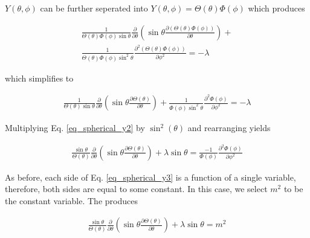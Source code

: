 \documentclass{article}
\numberwithin{equation}{subsection}
\begin{document}
$Y(\theta, \phi)$ can be further seperated into $Y(\theta, \phi) = \Theta(\theta)\Phi(\phi)$ which produces

\begin{equation}\label{eq_spherical_y}
\begin{split}
\frac{1}{\Theta(\theta)\Phi(\phi) \sin \theta}
\frac{\partial}{\partial \theta}
\left( \sin \theta \frac{\partial (\Theta(\theta)\Phi(\phi))}{\partial \theta}\right) 
+ \\
\frac{1}{\Theta(\theta)\Phi(\phi) \sin^2 \theta} 
\frac{\partial^2 (\Theta(\theta)\Phi(\phi))}{\partial \phi^2} = -\lambda
\end{split}
\end{equation}

\noindent
which simplifies to

\begin{equation}\label{eq_spherical_y2}
\begin{split}
\frac{1}{\Theta(\theta) \sin \theta}
\frac{\partial}{\partial \theta}
\left( \sin \theta \frac{\partial \Theta(\theta)}{\partial \theta}\right) 
+ 
\frac{1}{\Phi(\phi) \sin^2 \theta} 
\frac{\partial^2 \Phi(\phi)}{\partial \phi^2} = -\lambda
\end{split}
\end{equation}

Multiplying Eq. \ref{eq_spherical_y2} by $\sin^2(\theta)$ and rearranging yields

\begin{equation}\label{eq_spherical_y3}
\begin{split}
\frac{\sin \theta}{\Theta(\theta)}
\frac{\partial}{\partial \theta}
\left( \sin \theta \frac{\partial \Theta(\theta)}{\partial \theta}\right) 
+ \lambda \sin \theta
 = \frac{-1}{\Phi(\phi)} 
\frac{\partial^2 \Phi(\phi)}{\partial \phi^2}
\end{split}
\end{equation}

As before, each side of Eq. \ref{eq_spherical_y3} is a function of a single variable, therefore, both sides are equal to some constant. In this case, we select $m^2$ to be  the constant variable. The produces

\begin{equation}\label{eq_spherical_t}
\begin{split}
\frac{\sin \theta}{\Theta(\theta)}
\frac{\partial}{\partial \theta}
\left( \sin \theta \frac{\partial \Theta(\theta)}{\partial \theta}\right) 
+ \lambda \sin \theta
 = m^2
\end{split}
\end{equation}
\end{document}
